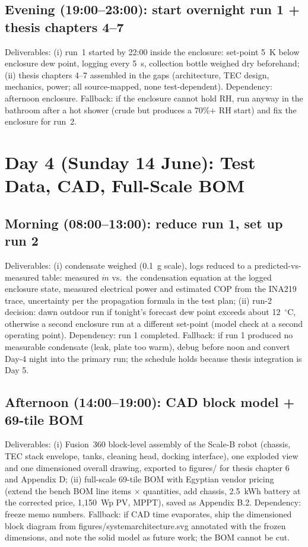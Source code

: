 \documentclass[11pt,a4paper]{article}
\newcommand{\f}[1]{{\ttfamily\def\_{\textunderscore\allowbreak}#1}}
\begin{document}
\subsection*{Evening (19:00--23:00): start overnight run 1 + thesis chapters 4--7}
Deliverables: (i) run~1 started by 22:00 inside the enclosure: set-point
5~K below enclosure dew point, logging every 5~s, collection bottle weighed
dry beforehand; (ii) thesis chapters 4--7 assembled in the gaps (architecture,
TEC design, mechanics, power; all source-mapped, none test-dependent).
Dependency: afternoon enclosure. Fallback: if the enclosure cannot hold RH,
run anyway in the bathroom after a hot shower (crude but produces a 70\%+ RH
start) and fix the enclosure for run~2.

\section{Day 4 (Sunday 14 June): Test Data, CAD, Full-Scale BOM}

\subsection*{Morning (08:00--13:00): reduce run 1, set up run 2}
Deliverables: (i) condensate weighed (0.1~g scale), logs reduced to a
predicted-vs-measured table: measured $\dot m$ vs.\ the condensation equation
at the logged enclosure state, measured electrical power and estimated COP
from the INA219 trace, uncertainty per the propagation formula in the test
plan; (ii) run-2 decision: dawn outdoor run if tonight's forecast dew point
exceeds about 12~$^{\circ}$C, otherwise a second enclosure run at a different
set-point (model check at a second operating point). Dependency: run 1
completed. Fallback: if run 1 produced no measurable condensate (leak, plate
too warm), debug before noon and convert Day-4 night into the primary run;
the schedule holds because thesis integration is Day 5.

\subsection*{Afternoon (14:00--19:00): CAD block model + 69-tile BOM}
Deliverables: (i) Fusion~360 block-level assembly of the Scale-B robot
(chassis, TEC stack envelope, tanks, cleaning head, docking interface), one
exploded view and one dimensioned overall drawing, exported to
\f{figures/} for thesis chapter 6 and Appendix D; (ii) full-scale 69-tile BOM
with Egyptian vendor pricing (extend the bench BOM line items $\times$
quantities, add chassis, 2.5~kWh battery at the corrected price, 1{,}150~Wp
PV, MPPT), saved as Appendix B.2. Dependency: freeze memo numbers. Fallback:
if CAD time evaporates, ship the dimensioned block diagram from
\f{figures/system\_architecture.svg} annotated with the frozen dimensions, and
note the solid model as future work; the BOM cannot be cut.
\end{document}
